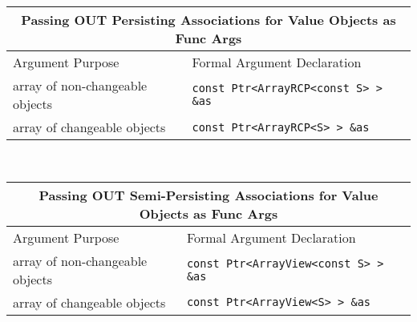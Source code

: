 %
\begin{tabular}{|l|l|}
%
\multicolumn{2}{c}{\textbf{Passing OUT Persisting Associations for Value Objects as Func Args}} \\
%
\hline
Argument Purpose
& Formal Argument Declaration \\
\hline
\hline
array of non-changeable objects
& {}\texttt{const Ptr<ArrayRCP<const S> > \&as} \\
\hline
array of changeable objects
& {}\texttt{const Ptr<ArrayRCP<S> > \&as} \\
\hline
\end{tabular} \\[3ex]
%
\begin{tabular}{|l|l|}
%
\multicolumn{2}{c}{\textbf{Passing OUT Semi-Persisting Associations for Value Objects as Func Args}} \\
%
\hline
Argument Purpose
& Formal Argument Declaration \\
\hline
\hline
array of non-changeable objects
& {}\texttt{const Ptr<ArrayView<const S> > \&as} \\
\hline
array of changeable objects
& {}\texttt{const Ptr<ArrayView<S> > \&as} \\
\hline
\end{tabular}
